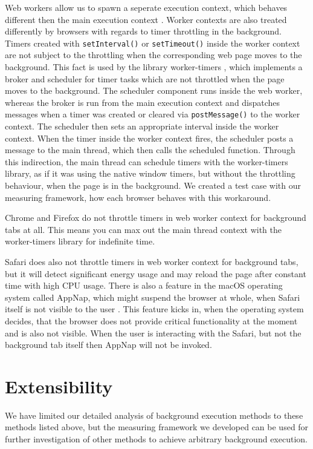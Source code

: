 \documentclass[
	ruledheaders=section,%
	class=report,%
	thesis={type=bachelor},%
	accentcolor=9c,%
	custommargins=true,%
	marginpar=false,%
	parskip=half-,%
	fontsize=11pt,%
]{tudapub}
\begin{document}
  Web workers allow us to spawn a seperate execution context, which behaves different then the main execution context \cite{mdn-worker}. Worker contexts are also treated differently by browsers with regards to timer throttling in the background. Timers created with \texttt{setInterval()} or \texttt{setTimeout()} inside the worker context are not subject to the throttling when the corresponding web page moves to the background. This fact is used by the library worker-timers \cite{worker-timers}, which implements a broker and scheduler for timer tasks which are not throttled when the page moves to the background. The scheduler component runs inside the web worker, whereas the broker is run from the main execution context and dispatches messages when a timer was created or cleared via \texttt{postMessage()} to the worker context. The scheduler then sets an appropriate interval inside the worker context. When the timer inside the worker context fires, the scheduler posts a message to the main thread, which then calls the scheduled function. Through this indirection, the main thread can schedule timers with the worker-timers library, as if it was using the native window timers, but without the throttling behaviour, when the page is in the background. We created a test case with our measuring framework, how each browser behaves with this workaround.
  
  Chrome and Firefox do not throttle timers in web worker context for background tabs at all. This means you can max out the main thread context with the worker-timers library for indefinite time.

  Safari does also not throttle timers in web worker context for background tabs, but it will detect significant energy usage and may reload the page after constant time with high CPU usage. There is also a feature in the macOS operating system called AppNap, which might suspend the browser at whole, when Safari itself is not visible to the user \cite{osx-app-nap}. This feature kicks in, when the operating system decides, that the browser does not provide critical functionality at the moment and is also not visible. When the user is interacting with the Safari, but not the background tab itself then AppNap will not be invoked.
  

  \section{Extensibility}

  We have limited our detailed analysis of background execution methods to these methods listed above, but the measuring framework we developed can be used for further investigation of other methods to achieve arbitrary background execution.
\end{document}

